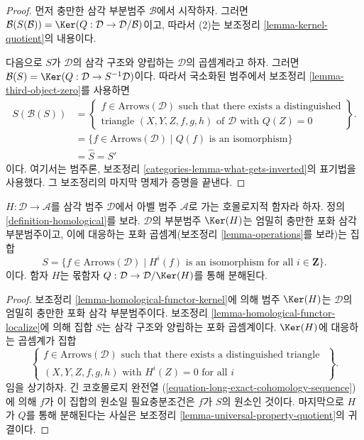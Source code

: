 \begin{proof}
먼저 충만한 삼각 부분범주 $\mathcal{B}$에서 시작하자. 그러면
$\mathcal{B}(S(\mathcal{B})) =
\Ker(Q : \mathcal{D} \to \mathcal{D}/\mathcal{B})$이고,
따라서 (2)는 보조정리 \ref{lemma-kernel-quotient}의 내용이다.

\medskip\noindent
다음으로 $S$가 $\mathcal{D}$의 삼각 구조와 양립하는 $\mathcal{D}$의
곱셈계라고 하자. 그러면
$\mathcal{B}(S) = \Ker(Q : \mathcal{D} \to S^{-1}\mathcal{D})$이다.
따라서 국소화된 범주에서 보조정리
\ref{lemma-third-object-zero}를 사용하면
\begin{align*}
S(\mathcal{B}(S))
& =
\left\{
\begin{matrix}
f \in \text{Arrows}(\mathcal{D})
\text{ such that there exists a distinguished}\\
\text{triangle }(X, Y, Z, f, g, h) \text{ of }\mathcal{D}\text{ with }Q(Z) = 0
\end{matrix}
\right\}.
\\
& =
\{f \in \text{Arrows}(\mathcal{D}) \mid Q(f)\text{ is an isomorphism}\} \\
& = \hat S = S'
\end{align*}
이다. 여기서는 범주론, 보조정리
\ref{categories-lemma-what-gets-inverted}의 표기법을 사용했다.
그 보조정리의 마지막 명제가 증명을 끝낸다.
\end{proof}

\begin{lemma}
\label{lemma-acyclic-general}
$H : \mathcal{D} \to \mathcal{A}$를 삼각 범주 $\mathcal{D}$에서
아벨 범주 $\mathcal{A}$로 가는 호몰로지적 함자라 하자. 정의
\ref{definition-homological}를 보라.
$\mathcal{D}$의 부분범주 $\Ker(H)$는 엄밀히 충만한 포화 삼각
부분범주이고, 이에 대응하는 포화 곱셈계(보조정리
\ref{lemma-operations}를 보라)는 집합
$$
S = \{f \in \text{Arrows}(\mathcal{D}) \mid
H^i(f)\text{ is an isomorphism for all }i \in \mathbf{Z}\}.
$$
이다. 함자 $H$는 몫함자
$Q : \mathcal{D} \to \mathcal{D}/\Ker(H)$를 통해 분해된다.
\end{lemma}

\begin{proof}
보조정리 \ref{lemma-homological-functor-kernel}에 의해 범주
$\Ker(H)$는 $\mathcal{D}$의 엄밀히 충만한 포화 삼각 부분범주이다.
보조정리 \ref{lemma-homological-functor-localize}에 의해 집합
$S$는 삼각 구조와 양립하는 포화 곱셈계이다.
$\Ker(H)$에 대응하는 곱셈계가 집합
$$
\left\{
\begin{matrix}
f \in \text{Arrows}(\mathcal{D})
\text{ such that there exists a distinguished triangle }\\
(X, Y, Z, f, g, h)\text{ with } H^i(Z) = 0 \text{ for all }i
\end{matrix}
\right\}.
$$
임을 상기하자. 긴 코호몰로지 완전열
(\ref{equation-long-exact-cohomology-sequence})에 의해
$f$가 이 집합의 원소일 필요충분조건은 $f$가 $S$의 원소인 것이다.
마지막으로 $H$가 $Q$를 통해 분해된다는 사실은 보조정리
\ref{lemma-universal-property-quotient}의 귀결이다.
\end{proof}

